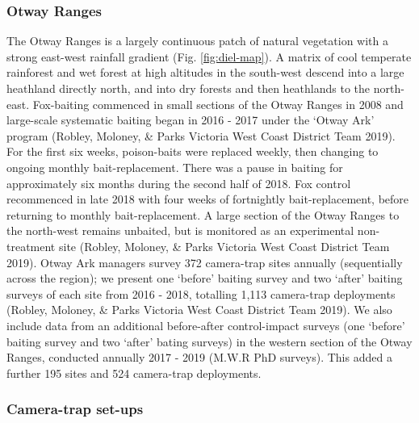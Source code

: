 \documentclass[11pt,a4paper,titlepage,twoside,openright]{style/unimelbthesis}
\begin{document}
\begin{mainmatter}
\hypertarget{otway-ranges-2}{%
\subsubsection{Otway Ranges}\label{otway-ranges-2}}

The Otway Ranges is a largely continuous patch of natural vegetation with a strong east-west rainfall gradient (Fig. \ref{fig:diel-map}). A matrix of cool temperate rainforest and wet forest at high altitudes in the south-west descend into a large heathland directly north, and into dry forests and then heathlands to the north-east. Fox-baiting commenced in small sections of the Otway Ranges in 2008 and large-scale systematic baiting began in 2016 - 2017 under the `Otway Ark' program (Robley, Moloney, \& Parks Victoria West Coast District Team 2019). For the first six weeks, poison-baits were replaced weekly, then changing to ongoing monthly bait-replacement. There was a pause in baiting for approximately six months during the second half of 2018. Fox control recommenced in late 2018 with four weeks of fortnightly bait-replacement, before returning to monthly bait-replacement. A large section of the Otway Ranges to the north-west remains unbaited, but is monitored as an experimental non-treatment site (Robley, Moloney, \& Parks Victoria West Coast District Team 2019). Otway Ark managers survey 372 camera-trap sites annually (sequentially across the region); we present one `before' baiting survey and two `after' baiting surveys of each site from 2016 - 2018, totalling 1,113 camera-trap deployments (Robley, Moloney, \& Parks Victoria West Coast District Team 2019). We also include data from an additional before-after control-impact surveys (one `before' baiting survey and two `after' bating surveys) in the western section of the Otway Ranges, conducted annually 2017 - 2019 (M.W.R PhD surveys). This added a further 195 sites and 524 camera-trap deployments.

\hypertarget{camera-trap-set-ups-1}{%
\subsubsection{Camera-trap set-ups}\label{camera-trap-set-ups-1}}


\end{mainmatter}
\end{document}
